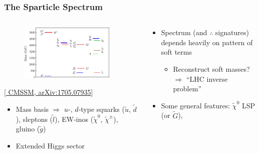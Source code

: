 \documentclass[10pt,aspectratio=169]{beamer}
\begin{document}
\begin{frame}
  \frametitle{The Sparticle Spectrum}
  \begin{columns}[t]
    \begin{column}{0.5\textwidth}
      \begin{figure}
        \centering
        \includegraphics[width=0.9\textwidth]{gambit_cmssm_best_fit}
      \end{figure}
      \vspace*{-25pt}
      \begin{center}
        { \tiny [\href{http://arxiv.org/abs/1705.07935}{%
              CMSSM, arXiv:1705.07935}] }
      \end{center}
      \begin{itemize}\itemsep1em
      \item Mass basis $\Rightarrow$ $u$-, $d$-type squarks ($\tilde{u}$,
        $\tilde{d}$), sleptons ($\tilde{l}$), EW-inos ($\tilde{\chi}^0$,
        $\tilde{\chi}^\pm$), gluino ($\tilde{g}$)
      \item {\color{blue} Extended Higgs sector}
      \end{itemize}
    \end{column}
    \begin{column}{0.5\textwidth}
      \vspace*{-15pt}
      \begin{itemize}\itemsep1em
      \item \alert{Spectrum (and $\therefore$ signatures) depends heavily
        on pattern of soft terms}
        \begin{itemize}
        \item Reconstruct soft masses? $\Rightarrow$ ``LHC inverse
          problem''
        \end{itemize}
      \item Some general features: $\tilde{\chi}^0$ LSP (or $\tilde{G}$),

\end{itemize}
\end{column}
\end{columns}
\end{frame}
\end{document}

